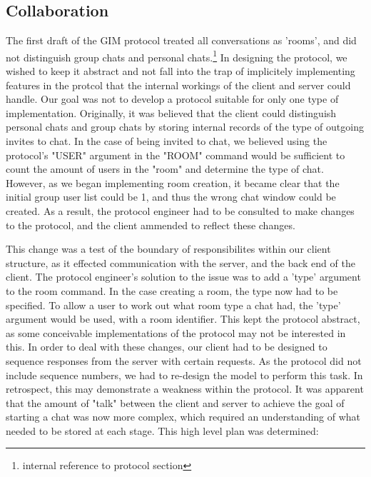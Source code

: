 \subsection{Collaboration}

The first draft of the GIM protocol treated all conversations as 'rooms', and did not distinguish group chats and personal chats.\footnote{internal reference to protocol section} In designing the protocol, we wished to keep it abstract and not fall into the trap of implicitely implementing features in the protcol that the internal workings of the client and server could handle. Our goal was not to develop a protocol suitable for only one type of implementation. Originally, it was believed that the client could distinguish personal chats and group chats by storing internal records of the type of outgoing invites to chat. In the case of being invited to chat, we believed using the protocol's "USER" argument in the "ROOM" command would be sufficient to count the amount of users in the "room" and determine the type of chat. However, as we began implementing room creation, it became clear that the initial group user list could be 1, and thus the wrong chat window could be created. As a result, the protocol engineer had to be consulted to make changes to the protocol, and the client ammended to reflect these changes. 

This change was a test of the boundary of responsibilites within our client structure, as it effected communication with the server, and the back end of the client. The protocol engineer's solution to the issue was to add a 'type' argument to the room command. In the case creating a room, the type now had to be specified. To allow a user to work out what room type a chat had, the 'type' argument would be used, with a room identifier. This kept the protocol abstract, as some conceivable implementations of the protocol may not be interested in this. In order to deal with these changes, our client had to be designed to sequence responses from the server with certain requests. As the protocol did not include sequence numbers, we had to re-design the model to perform this task. In retrospect, this may demonstrate a weakness within the protocol. It was apparent that the amount of "talk" between the client and server to achieve the goal of starting a chat was now more complex, which required an understanding of what needed to be stored at each stage. This high level plan was determined:


